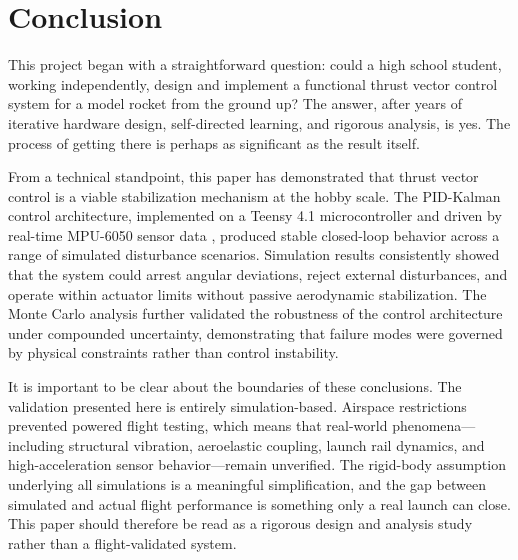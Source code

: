 \section{Conclusion}
\label{sec:conclusion}

This project began with a straightforward question: could a high school student, working
independently, design and implement a functional thrust vector control system for a model rocket
from the ground up? The answer, after years of iterative hardware design, self-directed learning,
and rigorous analysis, is yes. The process of getting there is perhaps as significant as the
result itself.

From a technical standpoint, this paper has demonstrated that thrust vector control is a viable
stabilization mechanism at the hobby scale. The PID-Kalman control architecture, implemented on a
Teensy 4.1 microcontroller and driven by real-time MPU-6050 sensor data \cite{invensense_mpu6050, pjrc_teensy41}, produced stable closed-loop behavior across a range of simulated disturbance
scenarios. Simulation results consistently showed that the system could arrest angular deviations,
reject external disturbances, and operate within actuator limits without passive aerodynamic
stabilization. The Monte Carlo analysis further validated the robustness of the control
architecture under compounded uncertainty, demonstrating that failure modes were governed by
physical constraints rather than control instability.

It is important to be clear about the boundaries of these conclusions. The validation presented
here is entirely simulation-based. Airspace restrictions prevented powered flight testing, which
means that real-world phenomena---including structural vibration, aeroelastic coupling, launch
rail dynamics, and high-acceleration sensor behavior---remain unverified. The rigid-body assumption
underlying all simulations is a meaningful simplification, and the gap between simulated and actual
flight performance is something only a real launch can close. This paper should therefore be read
as a rigorous design and analysis study rather than a flight-validated system.

